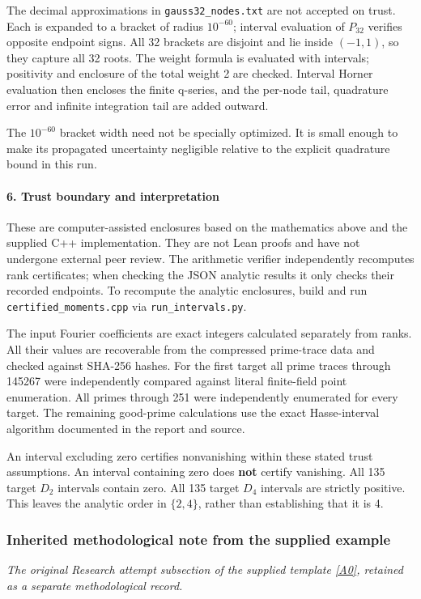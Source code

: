 \documentclass[11pt]{article}
\newcommand{\srcref}[1]{\hyperlink{source:#1}{[#1]}}
\begin{document}
The decimal approximations in \nolinkurl{gauss32_nodes.txt} are not accepted on trust. Each is expanded to a bracket of radius \(10^{-60}\); interval evaluation of \(P_{32}\) verifies opposite endpoint signs. All 32 brackets are disjoint and lie inside \((-1,1)\), so they capture all 32 roots. The weight formula is evaluated with intervals; positivity and enclosure of the total weight 2 are checked. Interval Horner evaluation then encloses the finite q-series, and the per-node tail, quadrature error and infinite integration tail are added outward.

The \(10^{-60}\) bracket width need not be specially optimized. It is small enough to make its propagated uncertainty negligible relative to the explicit quadrature bound in this run.

\paragraph{6. Trust boundary and interpretation}

These are computer-assisted enclosures based on the mathematics above and the supplied C++ implementation. They are not Lean proofs and have not undergone external peer review. The arithmetic verifier independently recomputes rank certificates; when checking the JSON analytic results it only checks their recorded endpoints. To recompute the analytic enclosures, build and run \nolinkurl{certified_moments.cpp} via \nolinkurl{run_intervals.py}.

The input Fourier coefficients are exact integers calculated separately from ranks. All their values are recoverable from the compressed prime-trace data and checked against SHA-256 hashes. For the first target all prime traces through 145267 were independently compared against literal finite-field point enumeration. All primes through 251 were independently enumerated for every target. The remaining good-prime calculations use the exact Hasse-interval algorithm documented in the report and source.

An interval excluding zero certifies nonvanishing within these stated trust assumptions. An interval containing zero does \textbf{not} certify vanishing. All 135 target \(D_2\) intervals contain zero. All 135 target \(D_4\) intervals are strictly positive. This leaves the analytic order in \(\{2,4\}\), rather than establishing that it is 4.

\subsubsection{Inherited methodological note from the supplied example}\label{template-method}
\textit{The original Research attempt subsection of the supplied template \srcref{A0}, retained as a separate methodological record.}
\end{document}
